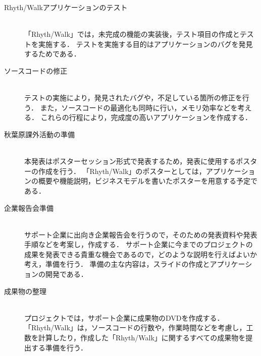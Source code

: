 \begin{description}
\item
[Rhyth/Walkアプリケーションのテスト]\mbox{}\\
	    「Rhyth/Walk」では，未完成の機能の実装後，テスト項目の作成とテストを実施する．
	    テストを実施する目的はアプリケーションのバグを発見するためである．

\item[ソースコードの修正]\mbox{}\\
	    テストの実施により，発見されたバグや，不足している箇所の修正を行う．
	    また，ソースコードの最適化も同時に行い，メモリ効率などを考える．
	    これらの行程により，完成度の高いアプリケーションを作成する．

\item[秋葉原課外活動の準備]\mbox{}\\
	    本発表はポスターセッション形式で発表するため，発表に使用するポスターの作成を行う．
	    「Rhyth/Walk」のポスターとしては，アプリケーションの概要や機能説明，ビジネスモデルを書いたポスターを用意する予定である．

\item[企業報告会準備]\mbox{}\\
	    サポート企業に出向き企業報告会を行うので，そのための発表資料や発表手順などを考案し，作成する．
	    サポート企業に今までのプロジェクトの成果を発表できる貴重な機会であるので，どのような説明を行えばよいか考え，準備を行う．
	    準備の主な内容は，スライドの作成とアプリケーションの開発である．

\item[成果物の整理]\mbox{}\\
	    プロジェクトでは，サポート企業に成果物のDVDを作成する．
	    「Rhyth/Walk」は，ソースコードの行数や，作業時間などを考慮し，工数を計算したり，作成した「Rhyth/Walk」に関するすべての成果物を提出する準備を行う．

\end{description}

